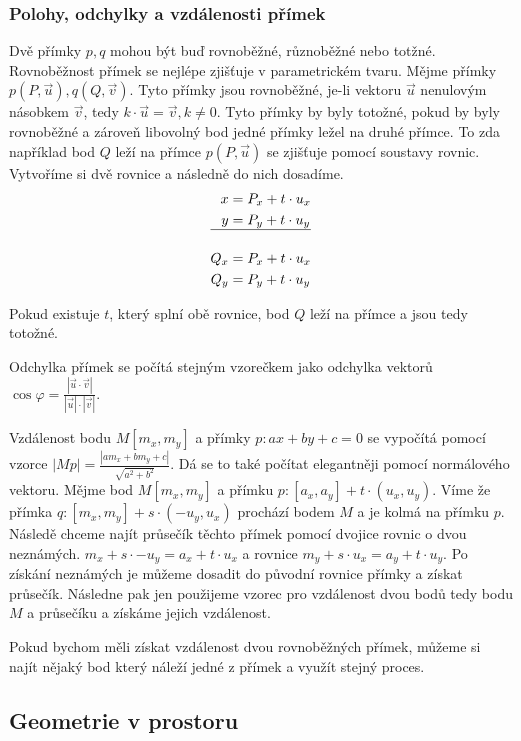 \documentclass[12pt]{article}
\begin{document}
\subsubsection*{Polohy, odchylky a vzdálenosti přímek}
Dvě přímky $p, q$ mohou být buď rovnoběžné, různoběžné nebo totžné. Rovnoběžnost přímek se nejlépe
zjišťuje v parametrickém tvaru. Mějme přímky $p(P, \vec{u}), q(Q, \vec{v})$. Tyto přímky jsou
rovnoběžné, je-li vektoru $\vec{u}$ nenulovým násobkem $\vec{v}$, tedy $k \cdot \vec{u} = \vec{v},
k \ne 0$. Tyto přímky by byly totožné, pokud by byly rovnoběžné a zároveň libovolný bod jedné
přímky ležel na druhé přímce. To zda například bod $Q$ leží na přímce $p(P, \vec{u})$ se zjišťuje
pomocí soustavy rovnic. Vytvoříme si dvě rovnice a následně do nich dosadíme.
\[
\begin{aligned}
    x &= P_x + t \cdot u_x \\
    y &= P_y + t \cdot u_y \\
    \hline \\
    Q_x &= P_x + t \cdot u_x \\
    Q_y &= P_y + t \cdot u_y
\end{aligned}
\]

Pokud existuje $t$, který splní obě rovnice, bod $Q$ leží na přímce a jsou tedy totožné.

Odchylka přímek se počítá stejným vzorečkem jako odchylka vektorů $\cos \varphi = \frac{|\vec{u}
\cdot \vec{v}|}{|\vec{u}| \cdot |\vec{v}|}$.

Vzdálenost bodu $M[m_x, m_y]$ a přímky $p: ax + by + c = 0$ se vypočítá pomocí vzorce $|Mp| = 
\frac{|am_x + bm_y + c|}{\sqrt{a^2 + b^2}}$. Dá se to také počítat elegantněji pomocí normálového
vektoru. Mějme bod $M[m_x, m_y]$ a přímku $p: [a_x, a_y] + t \cdot (u_x, u_y)$. Víme že přímka
$q: [m_x, m_y] + s \cdot (-u_y, u_x)$ prochází bodem $M$ a je kolmá na přímku $p$. Následě chceme
najít průsečík těchto přímek pomocí dvojice rovnic o dvou neznámých. $m_x + s \cdot -u_y =
a_x + t \cdot u_x$ a rovnice $m_y + s \cdot u_x = a_y + t \cdot u_y$. Po získání neznámých
je můžeme dosadit do původní rovnice přímky a získat průsečík. Následne pak jen použijeme
vzorec pro vzdálenost dvou bodů tedy bodu $M$ a průsečíku a získáme jejich vzdálenost.

Pokud bychom měli získat vzdálenost dvou rovnoběžných přímek, můžeme si najít nějaký bod který
náleží jedné z přímek a využít stejný proces.
\subsection*{Geometrie v prostoru}
\end{document}
